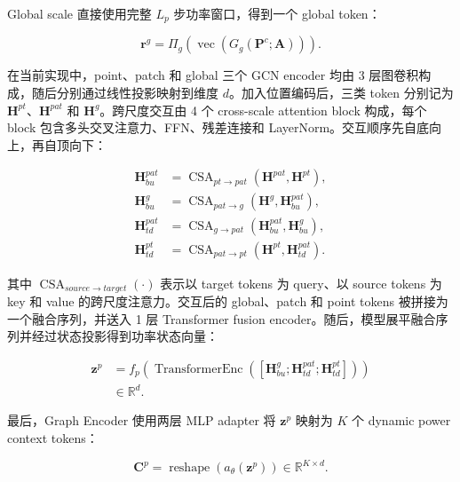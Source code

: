 Global scale 直接使用完整 \(L_p\) 步功率窗口，得到一个 global token：

\begin{equation}
\mathbf{r}^{g}=\Pi_{g}\left(\operatorname{vec}\left(G_{g}(\mathbf{P}^{c};\mathbf{A})\right)\right).
\end{equation}

在当前实现中，point、patch 和 global 三个 GCN encoder 均由 3 层图卷积构成，随后分别通过线性投影映射到维度 \(d\)。加入位置编码后，三类 token 分别记为 \(\mathbf{H}^{pt}\)、\(\mathbf{H}^{pat}\) 和 \(\mathbf{H}^{g}\)。跨尺度交互由 4 个 cross-scale attention block 构成，每个 block 包含多头交叉注意力、FFN、残差连接和 LayerNorm。交互顺序先自底向上，再自顶向下：

\begin{equation}
\begin{aligned}
\mathbf{H}^{pat}_{bu} &= \operatorname{CSA}_{pt\rightarrow pat}(\mathbf{H}^{pat},\mathbf{H}^{pt}), \\
\mathbf{H}^{g}_{bu} &= \operatorname{CSA}_{pat\rightarrow g}(\mathbf{H}^{g},\mathbf{H}^{pat}_{bu}), \\
\mathbf{H}^{pat}_{td} &= \operatorname{CSA}_{g\rightarrow pat}(\mathbf{H}^{pat}_{bu},\mathbf{H}^{g}_{bu}), \\
\mathbf{H}^{pt}_{td} &= \operatorname{CSA}_{pat\rightarrow pt}(\mathbf{H}^{pt},\mathbf{H}^{pat}_{td}).
\end{aligned}
\end{equation}

其中 \(\operatorname{CSA}_{source\rightarrow target}(\cdot)\) 表示以 target tokens 为 query、以 source tokens 为 key 和 value 的跨尺度注意力。交互后的 global、patch 和 point tokens 被拼接为一个融合序列，并送入 1 层 Transformer fusion encoder。随后，模型展平融合序列并经过状态投影得到功率状态向量：

\begin{equation}
\begin{aligned}
\mathbf{z}^{p}
&=f_p\left(\operatorname{TransformerEnc}\left([\mathbf{H}^{g}_{bu};\mathbf{H}^{pat}_{td};\mathbf{H}^{pt}_{td}]\right)\right) \\
&\in\mathbb{R}^{d}.
\end{aligned}
\end{equation}

最后，Graph Encoder 使用两层 MLP adapter 将 \(\mathbf{z}^{p}\) 映射为 \(K\) 个 dynamic power context tokens：

\begin{equation}
\mathbf{C}^{p}=\operatorname{reshape}\left(a_{\theta}(\mathbf{z}^{p})\right)\in\mathbb{R}^{K\times d}.
\end{equation}

